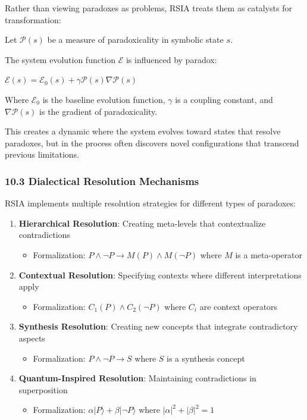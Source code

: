 \documentclass[12pt]{article}
\providecommand{\tightlist}{%
  \setlength{\itemsep}{0pt}\setlength{\parskip}{0pt}}
\begin{document}
Rather than viewing paradoxes as problems, RSIA treats them as catalysts
for transformation:

Let \(\mathcal{P}(s)\) be a measure of paradoxicality in symbolic state
\(s\).

The system evolution function \(\mathcal{E}\) is influenced by paradox:

\(\mathcal{E}(s) = \mathcal{E}_0(s) + \gamma \mathcal{P}(s) \nabla \mathcal{P}(s)\)

Where \(\mathcal{E}_0\) is the baseline evolution function, \(\gamma\)
is a coupling constant, and \(\nabla \mathcal{P}(s)\) is the gradient of
paradoxicality.

This creates a dynamic where the system evolves toward states that
resolve paradoxes, but in the process often discovers novel
configurations that transcend previous limitations.

\subsubsection{10.3 Dialectical Resolution
Mechanisms}\label{dialectical-resolution-mechanisms}

RSIA implements multiple resolution strategies for different types of
paradoxes:

\begin{enumerate}
\def\labelenumi{\arabic{enumi}.}
\item
  \textbf{Hierarchical Resolution}: Creating meta-levels that
  contextualize contradictions

  \begin{itemize}
  \tightlist
  \item
    Formalization: \(P \land \neg P \rightarrow M(P) \land M(\neg P)\)
    where \(M\) is a meta-operator
  \end{itemize}
\item
  \textbf{Contextual Resolution}: Specifying contexts where different
  interpretations apply

  \begin{itemize}
  \tightlist
  \item
    Formalization: \(C_1(P) \land C_2(\neg P)\) where \(C_i\) are
    context operators
  \end{itemize}
\item
  \textbf{Synthesis Resolution}: Creating new concepts that integrate
  contradictory aspects

  \begin{itemize}
  \tightlist
  \item
    Formalization: \(P \land \neg P \rightarrow S\) where \(S\) is a
    synthesis concept
  \end{itemize}
\item
  \textbf{Quantum-Inspired Resolution}: Maintaining contradictions in
  superposition

  \begin{itemize}
  \tightlist
  \item
    Formalization: \(\alpha|P\rangle + \beta|\neg P\rangle\) where
    \(|\alpha|^2 + |\beta|^2 = 1\)
  \end{itemize}
\end{enumerate}
\end{document}
